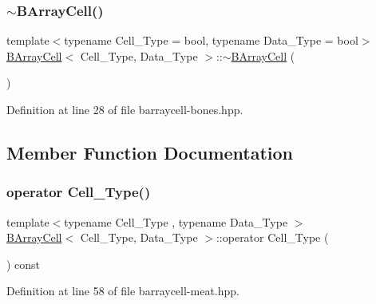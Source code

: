 \mbox{\label{class_b_array_cell_a6fbc56424caade490a72685cc35ad0e9}} 
\subsubsection{\texorpdfstring{$\sim$\+B\+Array\+Cell()}{~BArrayCell()}}
{\footnotesize\ttfamily template$<$typename Cell\+\_\+\+Type = bool, typename Data\+\_\+\+Type = bool$>$ \\
\hyperlink{class_b_array_cell}{B\+Array\+Cell}$<$ Cell\+\_\+\+Type, Data\+\_\+\+Type $>$\+::$\sim$\hyperlink{class_b_array_cell}{B\+Array\+Cell} (\begin{DoxyParamCaption}{ }\end{DoxyParamCaption})\hspace{0.3cm}{\ttfamily [inline]}}



Definition at line 28 of file barraycell-\/bones.\+hpp.



\subsection{Member Function Documentation}
\mbox{\label{class_b_array_cell_a698f664c230f91bf03a97966378e339b}} 
\subsubsection{\texorpdfstring{operator Cell\+\_\+\+Type()}{operator Cell\_Type()}}
{\footnotesize\ttfamily template$<$typename Cell\+\_\+\+Type , typename Data\+\_\+\+Type $>$ \\
\hyperlink{class_b_array_cell}{B\+Array\+Cell}$<$ Cell\+\_\+\+Type, Data\+\_\+\+Type $>$\+::operator Cell\+\_\+\+Type (\begin{DoxyParamCaption}{ }\end{DoxyParamCaption}) const\hspace{0.3cm}{\ttfamily [inline]}}



Definition at line 58 of file barraycell-\/meat.\+hpp.

